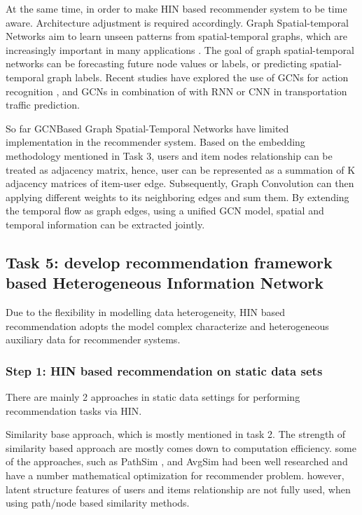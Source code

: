 At the same time, in order to make HIN based recommender system to be time aware. Architecture adjustment is required accordingly. Graph Spatial-temporal Networks aim to learn unseen patterns from spatial-temporal graphs, which are increasingly important in many applications \citep{wu2019comprehensive}. 
The goal of graph spatial-temporal networks can be forecasting future node values or labels, or predicting spatial-temporal graph labels. Recent studies have explored the use of GCNs for action recognition \citep{yan2018spatial}, and GCNs in combination of with RNN \citep{li2017diffusion} or CNN \citep{yu2017spatio} in transportation traffic prediction.

So far GCNBased Graph Spatial-Temporal Networks have limited implementation in the recommender system. Based on the embedding methodology mentioned in Task 3, users and item nodes relationship can be treated as adjacency matrix, hence, user can be represented as a summation of K adjacency matrices of item-user edge. Subsequently, Graph Convolution can then applying different weights to its neighboring edges and sum them. By extending the temporal flow as graph edges, using a unified GCN model, spatial and temporal information can be extracted jointly.

\subsection{Task 5: develop recommendation framework based Heterogeneous Information Network}

Due to the flexibility in modelling data heterogeneity, HIN based recommendation adopts the model complex characterize and heterogeneous auxiliary data for recommender systems.

\subsubsection*{Step 1: HIN based recommendation on static data sets}
There are mainly 2 approaches in static data settings for performing recommendation tasks via HIN. 

Similarity base approach, which is mostly mentioned in task 2. The strength of similarity based approach are mostly comes down to computation efficiency. some of the approaches, such as PathSim \citep{Sun2011PathSim}, and AvgSim \citep{xiao2016avgsim} had been well researched and have a number mathematical optimization for recommender problem. however, latent structure features of users and items relationship are not fully used, when using path/node based similarity methods.


